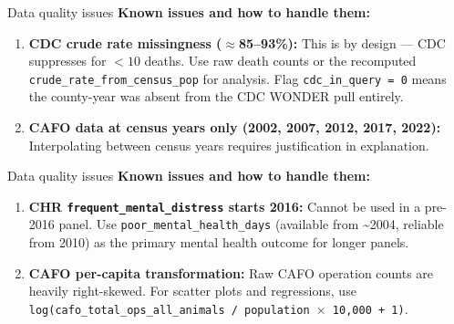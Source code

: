 \documentclass[aspectratio=169]{beamer}
\begin{document}
\begin{frame}{Data quality issues}
\textbf{Known issues and how to handle them:}

\vspace{0.5em}
\begin{enumerate}
    \item \textbf{CDC crude rate missingness ($\approx$85--93\%):} This is by design — CDC suppresses for $<10$ deaths. Use raw death counts or the recomputed \texttt{crude\_rate\_from\_census\_pop} for analysis. Flag \texttt{cdc\_in\_query = 0} means the county-year was absent from the CDC WONDER pull entirely.


    \item \textbf{CAFO data at census years only (2002, 2007, 2012, 2017, 2022):} Interpolating between census years requires justification in explanation. 

\end{enumerate}
\end{frame}

\begin{frame}{Data quality issues}
\textbf{Known issues and how to handle them:}

\vspace{0.5em}
\begin{enumerate}
    \item \textbf{CHR \texttt{frequent\_mental\_distress} starts 2016:} Cannot be used in a pre-2016 panel. Use \texttt{poor\_mental\_health\_days} (available from \textasciitilde 2004, reliable from 2010) as the primary mental health outcome for longer panels.

    \item \textbf{CAFO per-capita transformation:} Raw CAFO operation counts are heavily right-skewed. For scatter plots and regressions, use \texttt{log(cafo\_total\_ops\_all\_animals / population $\times$ 10{,}000 + 1)}.
\end{enumerate}
\end{frame}
\end{document}
